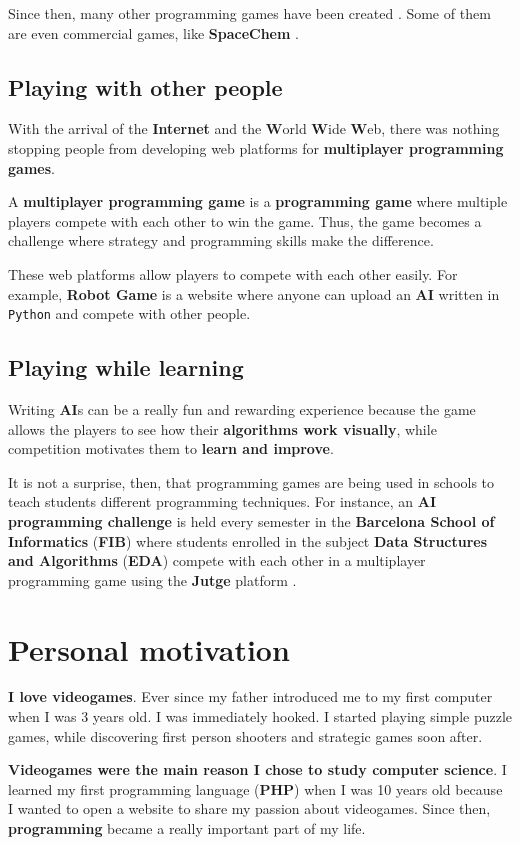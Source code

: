 \documentclass[a4paper,11pt,titlepage,abstract,numbers=noenddot,automark,mnsy,intlimits,rgb,dvipsnames]{report}
\begin{document}
Since then, many other programming games have been created \cite{pg}. Some of them are even commercial games, like
\textbf{SpaceChem} \cite{spacechem}.
\subsection{Playing with other people}
With the arrival of the \textbf{Internet} and the \textbf{W}orld \textbf{W}ide \textbf{W}eb, there was nothing stopping people from
developing web platforms for \textbf{multiplayer programming games}.

A \textbf{multiplayer programming game} is a \textbf{programming game} where multiple players compete with each other to win the
game. Thus, the game becomes a challenge where strategy and programming skills make the difference.

These web platforms allow players to compete with each other easily. For example, \textbf{Robot Game}
\cite{robotgame} is a website where anyone can upload an \textbf{AI} written in \texttt{Python} and compete with other people.
\subsection{Playing while learning}
Writing \textbf{AI}s can be a really fun and rewarding experience because the game allows the players to see how their
\textbf{algorithms work visually}, while competition motivates them to \textbf{learn and improve}.

It is not a surprise, then, that programming games are being used in schools to teach students different programming
techniques. For instance, an \textbf{AI programming challenge} is held every semester in the \textbf{Barcelona School of
Informatics} (\textbf{FIB}) where students enrolled in the subject \textbf{Data Structures and Algorithms} (\textbf{EDA}) \cite{eda}
compete with each other in a multiplayer programming game using the \textbf{Jutge} platform \cite{jutge}.
\section{Personal motivation}
\textbf{I love videogames}. Ever since my father introduced me to my first computer when I was 3 years old.
I was immediately hooked. I started playing simple puzzle games, while discovering first person shooters and strategic
games soon after.

\textbf{Videogames were the main reason I chose to study computer science}. I learned my first
programming language (\textbf{PHP}) when I was 10 years old because I wanted to open a website
to share my passion about videogames. Since then, \textbf{programming} became a really important part of my life.
\end{document}
